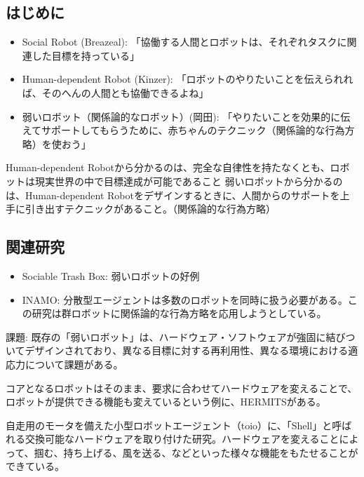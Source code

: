 \documentclass[fleqn,twocolumn]{mynote}
\begin{document}
  \subsection{はじめに}
  \begin{itemize}
    \item Social Robot
      (Breazeal)\cite{Breazeal-2004-SocialInteractionsHRIRobot}:
      「協働する人間とロボットは、それぞれタスクに関連した目標を持っている」
    \item Human-dependent Robot
      (Kinzer)\cite{--TweenbotsKacieKinzer}:
      「ロボットのやりたいことを伝えられれば、そのへんの人間とも協働できるよね」
    \item 弱いロボット（関係論的なロボット）(岡田)\cite{岡田美智男-2012-ゴミ箱ロ}:
      「やりたいことを効果的に伝えてサポートしてもらうために、赤ちゃんのテクニック（関係論的な行為方略）を使おう」
  \end{itemize}
  Human-dependent Robotから分かるのは、完全な自律性を持たなくとも、ロボットは現実世界の中で目標達成が可能であること
  弱いロボットから分かるのは、Human-dependent
  Robotをデザインするときに、人間からのサポートを上手に引き出すテクニックがあること。（関係論的な行為方略）

  \subsection{関連研究}
  \begin{itemize}
    \item Sociable Trash
      Box\cite{Yamaji-2010-STBHumandependentSociableTrash}: 弱いロボットの好例
    \item INAMO\cite{岡田美智男-2012-ゴミ箱ロ}:
      分散型エージェントは多数のロボットを同時に扱う必要がある。この研究は群ロボットに関係論的な行為方略を応用しようとしている。
  \end{itemize}

  課題:
  既存の「弱いロボット」は、ハードウェア・ソフトウェアが強固に結びついてデザインされており、異なる目標に対する再利用性、異なる環境における適応力について課題がある。

  コアとなるロボットはそのまま、要求に合わせてハードウェアを変えることで、ロボットが提供できる機能も変えているという例に、HERMITS\cite{Group-2020-HERMITS}がある。

  自走用のモータを備えた小型ロボットエージェント（toio）に、「Shell」と呼ばれる交換可能なハードウェアを取り付けた研究。ハードウェアを変えることによって、掴む、持ち上げる、風を送る、などといった様々な機能をもたせることができている。
\end{document}
